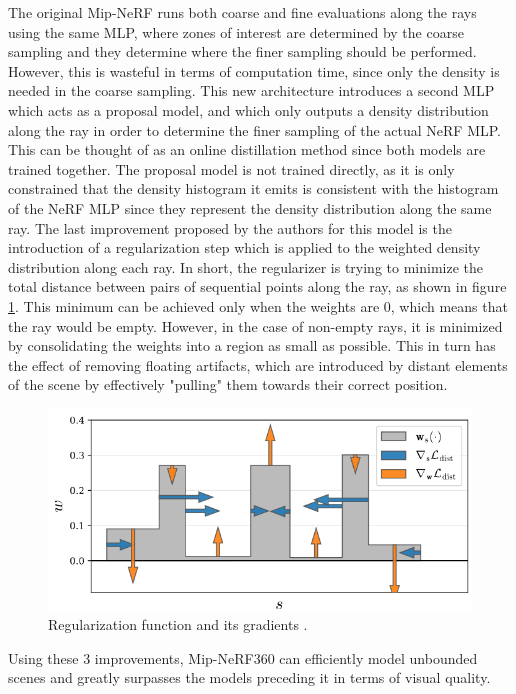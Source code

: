 The original Mip-NeRF runs both coarse and fine evaluations along the rays using the same MLP, where zones of interest are determined by the coarse sampling and they determine where the finer sampling should be performed. However, this is wasteful in terms of computation time, since only the density is needed in the coarse sampling. This new architecture introduces a second MLP which acts as a proposal model, and which only outputs a density distribution along the ray in order to determine the finer sampling of the actual NeRF MLP. This can be thought of as an online distillation method since both models are trained together. The proposal model is not trained directly, as it is only constrained that the density histogram it emits is consistent with the histogram of the NeRF MLP since they represent the density distribution along the same ray. The last improvement proposed by the authors for this model is the introduction of a regularization step which is applied to the weighted density distribution along each ray. In short, the regularizer is trying to minimize the total distance between pairs of sequential points along the ray, as shown in figure \ref{fig:360grads}. This minimum can be achieved only when the weights are 0, which means that the ray would be empty. However, in the case of non-empty rays, it is minimized by consolidating the weights into a region as small as possible. This in turn has the effect of removing floating artifacts, which are introduced by distant elements of the scene by effectively "pulling" them towards their correct position. 

\begin{figure}
    \centering
    \includegraphics[width=0.6\linewidth]{figures/360-gradients.png}
    \caption{Regularization function and its gradients \cite{barron2022mipnerf360}.}
    \label{fig:360grads}
\end{figure}

Using these 3 improvements, Mip-NeRF360 can efficiently model unbounded scenes and greatly surpasses the models preceding it in terms of visual quality.

